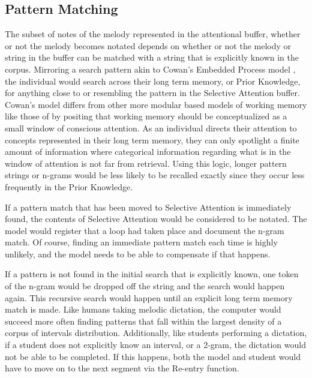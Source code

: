 \documentclass[12pt,]{book}
\begin{document}
\hypertarget{pattern-matching}{%
\subsection{Pattern Matching}\label{pattern-matching}}

The subset of notes of the melody represented in the attentional buffer, whether or not the melody becomes notated depends on whether or not the melody or string in the buffer can be matched with a string that is explicitly known in the corpus.
Mirroring a search pattern akin to Cowan's Embedded Process model \citep{cowanEvolvingConceptionsMemory1988, cowanMagicalMysteryFour2010}, the individual would search across their long term memory, or Prior Knowledge, for anything close to or resembling the pattern in the Selective Attention buffer.
Cowan's model differs from other more modular based models of working memory like those of \citet{baddeleyWorkingMemory1974} by positing that working memory should be conceptualized as a small window of conscious attention.
As an individual directs their attention to concepts represented in their long term memory, they can only spotlight a finite amount of information where categorical information regarding what is in the window of attention is not far from retrieval.
Using this logic, longer pattern strings or n-grams would be less likely to be recalled exactly since they occur less frequently in the Prior Knowledge.

If a pattern match that has been moved to Selective Attention is immediately found, the contents of Selective Attention would be considered to be notated.
The model would register that a loop had taken place and document the n-gram match.
Of course, finding an immediate pattern match each time is highly unlikely, and the model needs to be able to compensate if that happens.

If a pattern is not found in the initial search that is explicitly known, one token of the n-gram would be dropped off the string and the search would happen again.
This recursive search would happen until an explicit long term memory match is made.
Like humans taking melodic dictation, the computer would succeed more often finding patterns that fall within the largest density of a corpus of intervals distribution.
Additionally, like students performing a dictation, if a student does not explicitly know an interval, or a 2-gram, the dictation would not be able to be completed.
If this happens, both the model and student would have to move on to the next segment via the Re-entry function.
\end{document}

